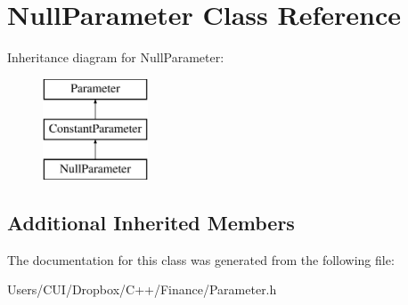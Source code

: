 \hypertarget{class_null_parameter}{}\section{Null\+Parameter Class Reference}
\label{class_null_parameter}
Inheritance diagram for Null\+Parameter\+:\begin{figure}[H]
\begin{center}
\leavevmode
\includegraphics[height=3.000000cm]{class_null_parameter}
\end{center}
\end{figure}
\subsection*{Additional Inherited Members}


The documentation for this class was generated from the following file\+:\begin{DoxyCompactItemize}
\item 
Users/\+C\+U\+I/\+Dropbox/\+C++/\+Finance/Parameter.\+h\end{DoxyCompactItemize}
